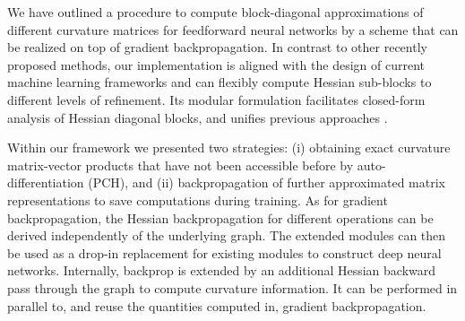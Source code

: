 We have outlined a procedure to compute block-diagonal approximations of
different curvature matrices for feedforward neural networks by a scheme that
can be realized on top of gradient backpropagation. In contrast to other
recently proposed methods, our implementation is aligned with the design of
current machine learning frameworks and can flexibly compute Hessian sub-blocks
to different levels of refinement. Its modular formulation facilitates
closed-form analysis of Hessian diagonal blocks, and unifies previous approaches
\citep{botev2017practical,wei2018bdapch}.

Within our framework we presented two strategies: (i) obtaining exact curvature
matrix-vector products that have not been accessible before by
auto-differentiation (PCH), and (ii) backpropagation of further approximated
matrix representations to save computations during training. As for gradient
backpropagation, the Hessian backpropagation for different operations can be
derived independently of the underlying graph. The extended modules can then be
used as a drop-in replacement for existing modules to construct deep neural
networks. Internally, backprop is extended by an additional Hessian backward
pass through the graph to compute curvature information. It can be performed in
parallel to, and reuse the quantities computed in, gradient backpropagation.

